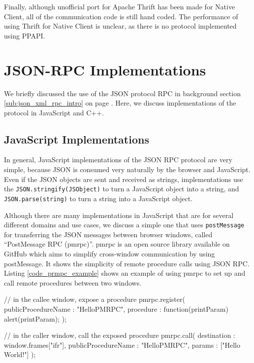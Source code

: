 Finally, although unofficial port for Apache Thrift has been made for Native Client\cite{thriftnacl}, all of the communication code is still hand coded. The performance of using Thrift for Native Client is unclear, as there is no protocol implemented using PPAPI.





\section{JSON-RPC Implementations} %
We briefly discussed the use of the JSON protocol RPC in background section \ref{sub:json_xml_rpc_intro} on page \pageref{sub:json_xml_rpc_intro}. Here, we discuss implementations of the protocol in JavaScript and C++.
\label{sec:json_rpc_implementations}


\subsection{JavaScript Implementations} %
\label{sub:pmrpc_json_rpc_using_postmessage}

In general, JavaScript implementations of the JSON RPC protocol are very simple, because JSON is consumed very naturally by the browser and JavaScript. Even if the JSON objects are sent and received as strings, implementations use the \lstinline{JSON.stringify(JSObject)} to turn a JavaScript object into a string, and \lstinline{JSON.parse(string)} to turn a string into a JavaScript object.

Although there are many implementations in JavaScript that are for several different domains and use cases, we discuss a simple one that uses \lstinline{postMessage} for transferring the JSON messages between browser windows, called ``PostMessage RPC (pmrpc)''. pmrpc is an open source library available on GitHub\cite{pmrpc} which aims to simplify cross-window communication by using postMessage. It shows the simplicity of remote procedure calls using JSON RPC. Listing \ref{code_prmpc_example} shows an example of using pmrpc to set up and call remote procedures between two windows.

\begin{code}
// in the callee window, expose a procedure
pmrpc.register({
  publicProcedureName : "HelloPMRPC",
  procedure : function(printParam) { alert(printParam); } 
});

// in the caller window, call the exposed procedure
pmrpc.call({
  destination : window.frames["ifr"],
  publicProcedureName : "HelloPMRPC",
  params : ["Hello World!"]
});
\end{code}

